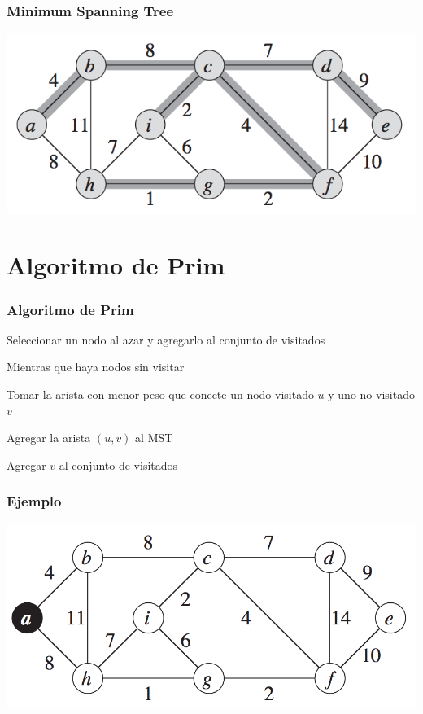 \documentclass{beamer}
\begin{document}
	\begin{frame}
		\frametitle{Minimum Spanning Tree}
		\includegraphics[width = \textwidth]{MST.png}
	\end{frame}
	

\section[Prim]{Algoritmo de Prim}
	\begin{frame}
		\frametitle{Algoritmo de Prim}
		\begin{enumerate}
			\item{Seleccionar un nodo al azar y agregarlo al conjunto de visitados}
			\item{Mientras que haya nodos sin visitar}
			{\setlength\itemindent{15pt} \item Tomar la arista con menor peso que conecte un nodo visitado $u$ y uno no visitado $v$}
			{\setlength\itemindent{15pt} \item Agregar la arista $(u, v)$ al MST}
			{\setlength\itemindent{15pt} \item Agregar $v$ al conjunto de visitados}
		\end{enumerate}
	\end{frame}
	
	\begin{frame}
		\frametitle{Ejemplo}
		\includegraphics[width = \textwidth]{Ejemplo.png}
	\end{frame}
	
\end{document}
